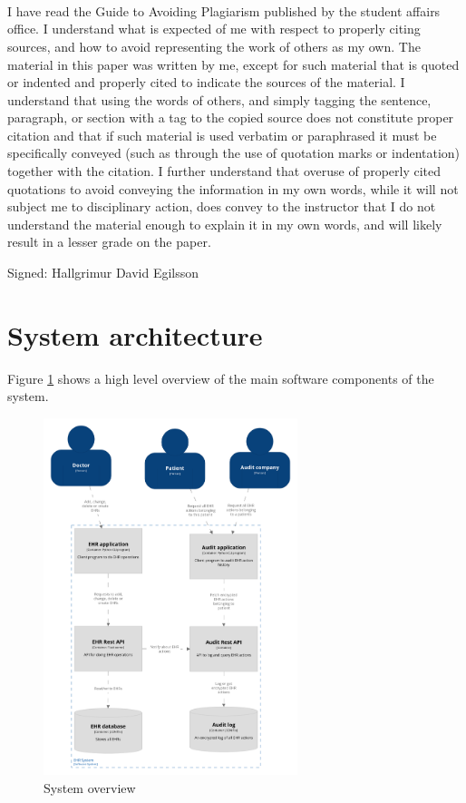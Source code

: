\documentclass[11pt]{article}
\title{
\huge\nafnanamskeidi\\
\vspace{8mm}
\nafnaverkefni\vspace{\haednemanda}}
\author{\nafnanemanda\\
        \nafnakennara\vspace{\haeddagsetningar}}
\date{\dagsetning\vspace{\haedtexta}}
\begin{document}
\maketitle
\thispagestyle{bls1}
	
\begin{flushleft}

\vspace{24mm}
I have read the Guide to Avoiding Plagiarism published by the student affairs office. I understand what is expected of me with respect to properly citing sources, and how to avoid representing the work of others as my own. The material in this paper was written by me, except for such material that is quoted or indented and properly cited to indicate the sources of the material. I understand that using the words of others, and simply tagging the sentence, paragraph, or section with a tag to the copied source does not constitute proper citation and that if such material is used verbatim or paraphrased it must be specifically conveyed (such as through the use of quotation marks or indentation) together with the citation. I further understand that overuse of properly cited quotations to avoid conveying the information in my own words, while it will not subject me to disciplinary action, does convey to the instructor that I do not understand the material enough to explain it in my own words, and will likely result in a lesser grade on the paper.

Signed: Hallgrimur David Egilsson

\newpage

\section{System architecture}

Figure \ref{fig:system_architecture} shows a high level overview of the main software components of the system.


\begin{figure}[h!]
\begin{center}
	\includegraphics[width = 280px]{system_architecture_2.png}
	\caption{System overview}
	\label{fig:system_architecture}
\end{center}
\end{figure}


\end{flushleft}
\end{document}
